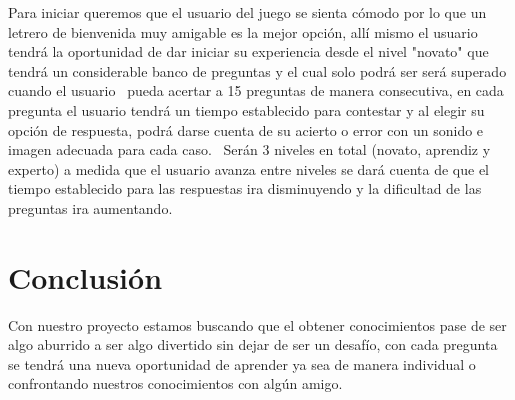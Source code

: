 \documentclass{article}
\begin{document}
Para iniciar queremos que el usuario del juego se sienta cómodo por lo que un letrero de bienvenida muy amigable es la mejor opción, allí mismo el usuario tendrá la oportunidad de dar iniciar  su experiencia  desde el nivel "novato" que tendrá un considerable banco de preguntas y el cual solo podrá ser será superado cuando el usuario  pueda acertar a 15 preguntas de manera consecutiva, en cada pregunta el usuario tendrá un tiempo establecido para contestar y al elegir su opción de respuesta, podrá darse cuenta de su acierto o error con un sonido e imagen adecuada para cada caso.  Serán 3 niveles en total (novato, aprendiz y experto) a medida que el usuario avanza entre niveles se dará cuenta de que el tiempo establecido para las respuestas ira disminuyendo y la dificultad de las preguntas ira aumentando.


\newpage
\section{Conclusión}
Con nuestro proyecto estamos buscando que el obtener conocimientos pase de ser algo aburrido a ser algo divertido sin dejar de ser un desafío, con cada pregunta se tendrá una nueva oportunidad de aprender ya sea de manera individual o confrontando nuestros conocimientos con algún amigo.
\end{document}
